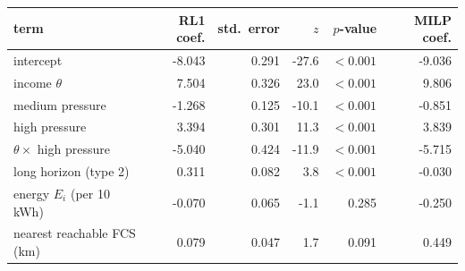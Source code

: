 \begin{tabular}{@{}lrrrrr@{}}
\toprule
term & RL1 coef. & std.\ error & $z$ & $p$-value & MILP coef. \\
\midrule
intercept & -8.043 & 0.291 & -27.6 & $<0.001$ & -9.036 \\
income $\theta$ & 7.504 & 0.326 & 23.0 & $<0.001$ & 9.806 \\
medium pressure & -1.268 & 0.125 & -10.1 & $<0.001$ & -0.851 \\
high pressure & 3.394 & 0.301 & 11.3 & $<0.001$ & 3.839 \\
$\theta\times$ high pressure & -5.040 & 0.424 & -11.9 & $<0.001$ & -5.715 \\
long horizon (type 2) & 0.311 & 0.082 & 3.8 & $<0.001$ & -0.030 \\
energy $E_i$ (per 10 kWh) & -0.070 & 0.065 & -1.1 & 0.285 & -0.250 \\
nearest reachable FCS (km) & 0.079 & 0.047 & 1.7 & 0.091 & 0.449 \\
\bottomrule
\end{tabular}
